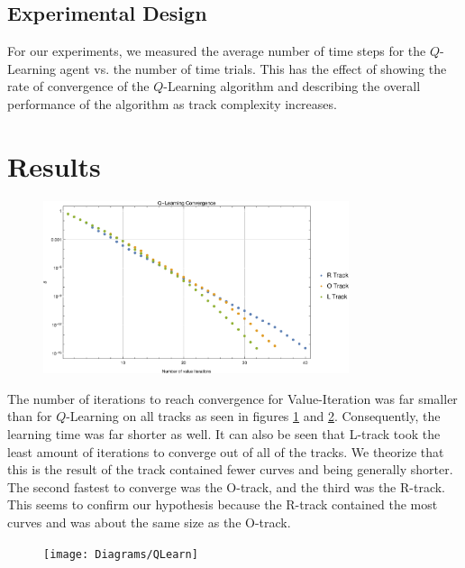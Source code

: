 \documentclass{article}
\begin{document}
		\subsection{Experimental Design}
		
			For our experiments, we measured the average number of time steps for the $Q$-Learning agent vs. the number of time trials. This has the effect of showing the rate of convergence of the $Q$-Learning algorithm and describing the overall performance of the algorithm as track complexity increases.
		
	\section{Results}		
				\begin{figure}[h!]
					\centering
					\includegraphics[width=0.8\textwidth]{Diagrams/VIter}
					\caption{}
					\label{VIter}
				\end{figure}
				
				The number of iterations to reach convergence for Value-Iteration was far smaller than for $Q$-Learning on all tracks as seen in figures \ref{VIter} and \ref{QLearn}. Consequently, the learning time was far shorter as well. It can also be seen that L-track took the least amount of iterations to converge out of all of the tracks. We theorize that this is the result of the track contained fewer curves and being generally shorter. The second fastest to converge was the O-track, and the third was the R-track. This seems to confirm our hypothesis because the R-track contained the most curves and was about the same size as the O-track.

				
				
				
				\begin{figure}[h!]
					\centering
					\texttt{[image: Diagrams/QLearn]}
					\caption{}
					\label{QLearn}
				\end{figure}
				
\end{document}

